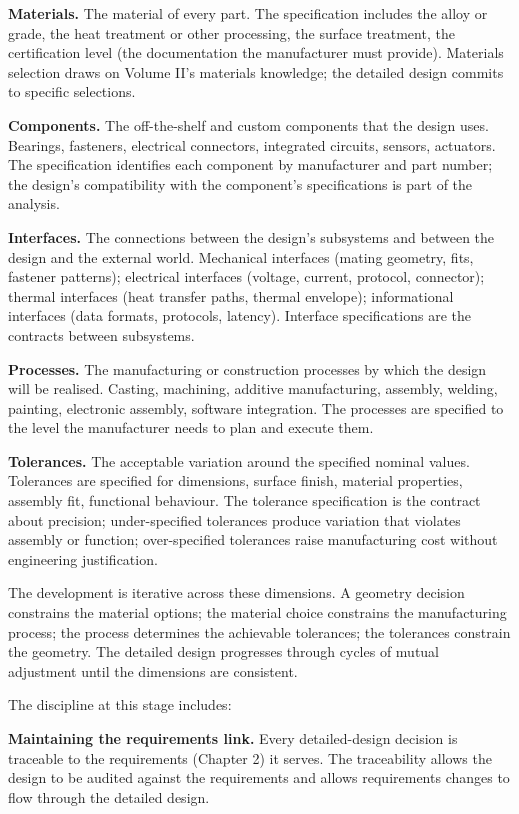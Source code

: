 \textbf{Materials.} The material of every part. The specification includes the alloy or grade, the heat treatment or other processing, the surface treatment, the certification level (the documentation the manufacturer must provide). Materials selection draws on Volume II's materials knowledge; the detailed design commits to specific selections.

\textbf{Components.} The off-the-shelf and custom components that the design uses. Bearings, fasteners, electrical connectors, integrated circuits, sensors, actuators. The specification identifies each component by manufacturer and part number; the design's compatibility with the component's specifications is part of the analysis.

\textbf{Interfaces.} The connections between the design's subsystems and between the design and the external world. Mechanical interfaces (mating geometry, fits, fastener patterns); electrical interfaces (voltage, current, protocol, connector); thermal interfaces (heat transfer paths, thermal envelope); informational interfaces (data formats, protocols, latency). Interface specifications are the contracts between subsystems.

\textbf{Processes.} The manufacturing or construction processes by which the design will be realised. Casting, machining, additive manufacturing, assembly, welding, painting, electronic assembly, software integration. The processes are specified to the level the manufacturer needs to plan and execute them.

\textbf{Tolerances.} The acceptable variation around the specified nominal values. Tolerances are specified for dimensions, surface finish, material properties, assembly fit, functional behaviour. The tolerance specification is the contract about precision; under-specified tolerances produce variation that violates assembly or function; over-specified tolerances raise manufacturing cost without engineering justification.

The development is iterative across these dimensions. A geometry decision constrains the material options; the material choice constrains the manufacturing process; the process determines the achievable tolerances; the tolerances constrain the geometry. The detailed design progresses through cycles of mutual adjustment until the dimensions are consistent.

The discipline at this stage includes:

\textbf{Maintaining the requirements link.} Every detailed-design decision is traceable to the requirements (Chapter 2) it serves. The traceability allows the design to be audited against the requirements and allows requirements changes to flow through the detailed design.

